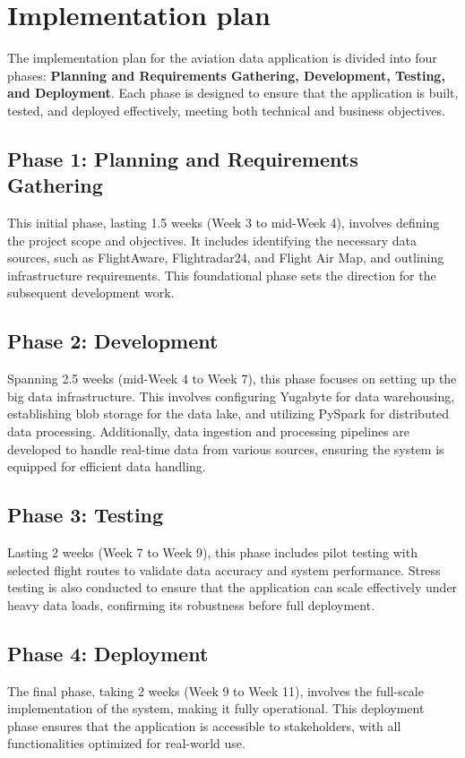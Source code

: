 \documentclass[12pt,a4paper]{article}
\begin{document}
\section{Implementation plan}
The implementation plan for the aviation data application is divided into four
phases: \textbf{Planning and Requirements Gathering, Development, Testing, and
Deployment}. Each phase is designed to ensure that the application is built,
tested, and deployed effectively, meeting both technical and business
objectives.

\subsection*{Phase 1: Planning and Requirements Gathering}
This initial phase, lasting 1.5 weeks (Week 3 to mid-Week 4), involves defining
the project scope and objectives. It includes identifying the necessary data
sources, such as FlightAware, Flightradar24, and Flight Air Map, and outlining
infrastructure requirements. This foundational phase sets the direction for the
subsequent development work.

\subsection*{Phase 2: Development}
Spanning 2.5 weeks (mid-Week 4 to Week 7), this phase focuses on setting up the
big data infrastructure. This involves configuring Yugabyte for data
warehousing, establishing blob storage for the data lake, and utilizing PySpark
for distributed data processing. Additionally, data ingestion and processing
pipelines are developed to handle real-time data from various sources, ensuring
the system is equipped for efficient data handling.
\subsection*{Phase 3: Testing}
Lasting 2 weeks (Week 7 to Week 9), this phase includes pilot testing with
selected flight routes to validate data accuracy and system performance. Stress
testing is also conducted to ensure that the application can scale effectively
under heavy data loads, confirming its robustness before full deployment.
\subsection*{Phase 4: Deployment}
The final phase, taking 2 weeks (Week 9 to Week 11), involves the full-scale
implementation of the system, making it fully operational. This deployment phase
ensures that the application is accessible to stakeholders, with all
functionalities optimized for real-world use.

\nocite{*}



\end{document}
